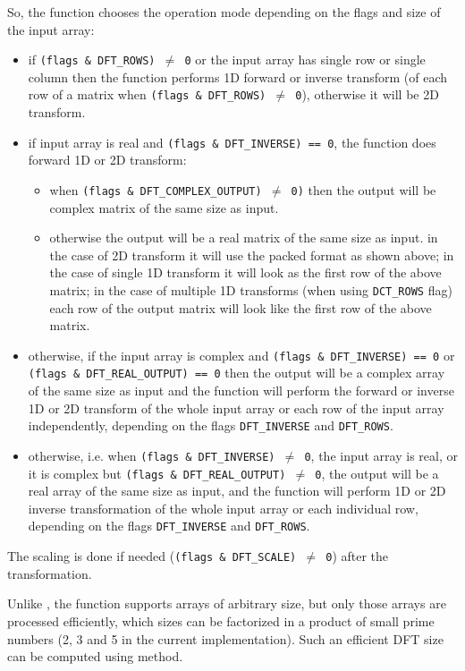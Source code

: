 So, the function chooses the operation mode depending on the flags and size of the input array:
\begin{itemize}
    \item if \texttt{(flags \& DFT\_ROWS) $\ne$ 0} or the input array has single row or single column then the function performs 1D forward or inverse transform (of each row of a matrix when \texttt{(flags \& DFT\_ROWS) $\ne$ 0}), otherwise it will be 2D transform.
    \item if input array is real and \texttt{(flags \& DFT\_INVERSE) == 0}, the function does forward 1D or 2D transform:
    \begin{itemize}
        \item when \texttt{(flags \& DFT\_COMPLEX\_OUTPUT) $\ne$ 0)} then the output will be complex matrix of the same size as input.
        \item otherwise the output will be a real matrix of the same size as input. in the case of 2D transform it will use the packed format as shown above; in the case of single 1D transform it will look as the first row of the above matrix; in the case of multiple 1D transforms (when using \texttt{DCT\_ROWS} flag) each row of the output matrix will look like the first row of the above matrix.
    \end{itemize}
    \item otherwise, if the input array is complex and \texttt{(flags \& DFT\_INVERSE) == 0} or \texttt{(flags \& DFT\_REAL\_OUTPUT) == 0} then the output will be a complex array of the same size as input and the function will perform the forward or inverse 1D or 2D transform of the whole input array or each row of the input array independently, depending on the flags \texttt{DFT\_INVERSE} and \texttt{DFT\_ROWS}.
    \item otherwise, i.e. when \texttt{(flags \& DFT\_INVERSE) $\ne$ 0}, the input array is real, or it is complex but \texttt{(flags \& DFT\_REAL\_OUTPUT) $\ne$ 0}, the output will be a real array of the same size as input, and the function will perform 1D or 2D inverse transformation of the whole input array or each individual row, depending on the flags \texttt{DFT\_INVERSE} and \texttt{DFT\_ROWS}.
\end{itemize}

The scaling is done if needed (\texttt{(flags \& DFT\_SCALE) $\ne$ 0}) after the transformation.

Unlike , the function supports arrays of arbitrary size, but only those arrays are processed efficiently, which sizes can be factorized in a product of small prime numbers (2, 3 and 5 in the current implementation). Such an efficient DFT size can be computed using  method.

